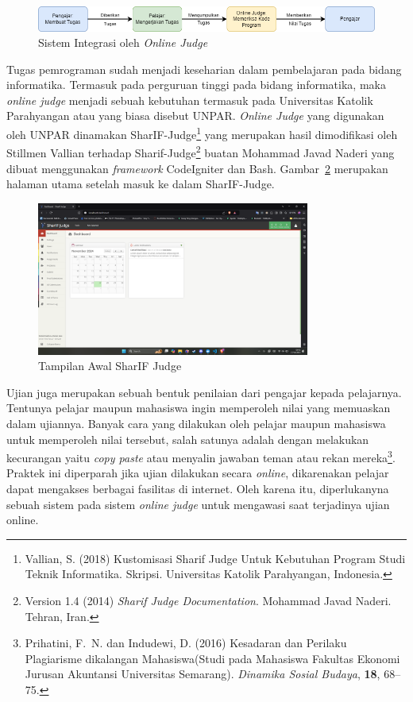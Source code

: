 \documentclass[a4paper,twoside]{article}
\begin{document}
\begin{figure}[H]
	\centering
	\includegraphics[width=\textwidth]{online_judge.drawio.png}
	\caption[Sistem Integrasi oleh \textit{Online Judge}]{Sistem Integrasi oleh \textit{Online Judge}}
	\label{fig:1:onlinejudge}
\end{figure}

Tugas pemrograman sudah menjadi keseharian dalam pembelajaran pada bidang informatika.
Termasuk pada perguruan tinggi pada bidang informatika, maka \textit{online judge} menjadi sebuah kebutuhan termasuk pada Universitas Katolik Parahyangan atau yang biasa disebut UNPAR.
\textit{Online Judge} yang digunakan oleh UNPAR dinamakan SharIF-Judge\footnote{Vallian, S. (2018) {Kustomisasi Sharif Judge Untuk Kebutuhan Program Studi Teknik Informatika}. Skripsi. Universitas Katolik Parahyangan, Indonesia.} yang merupakan hasil dimodifikasi oleh Stillmen Vallian terhadap Sharif-Judge\footnote{Version 1.4 (2014) {\em Sharif Judge Documentation}. Mohammad Javad Naderi. Tehran, Iran.} buatan Mohammad Javad Naderi yang dibuat menggunakan \textit{framework} CodeIgniter dan Bash. Gambar~\ref{fig:1:dashboardpng} merupakan halaman utama setelah masuk ke dalam SharIF-Judge.

\begin{figure}[H]
	\centering
	\includegraphics[width=0.8\textwidth]{dashboard.png}
	\caption[Tampilan Awal SharIF Judge]{Tampilan Awal SharIF Judge}
	\label{fig:1:dashboardpng}
\end{figure}

Ujian juga merupakan sebuah bentuk penilaian dari pengajar kepada pelajarnya. Tentunya pelajar maupun mahasiswa ingin memperoleh nilai yang memuaskan dalam ujiannya. Banyak cara yang dilakukan oleh pelajar maupun mahasiswa untuk memperoleh nilai tersebut, salah satunya adalah dengan melakukan kecurangan yaitu \textit{copy paste} atau menyalin jawaban teman atau rekan mereka\footnote{Prihatini, F.~N. dan Indudewi, D. (2016) {Kesadaran dan Perilaku Plagiarisme dikalangan Mahasiswa(Studi pada Mahasiswa Fakultas Ekonomi Jurusan Akuntansi Universitas Semarang)}. {\em Dinamika Sosial Budaya}, {\bf  18}, 68--75.}. Praktek ini diperparah jika ujian dilakukan secara \textit{online}, dikarenakan pelajar dapat mengakses berbagai fasilitas di internet. Oleh karena itu, diperlukanyna sebuah sistem pada sistem \textit{online judge} untuk mengawasi saat terjadinya ujian online.
\end{document}
